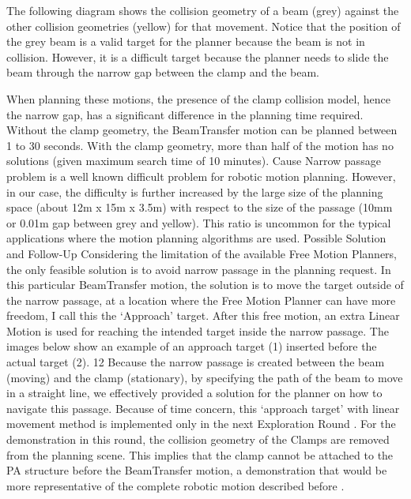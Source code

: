 The following diagram shows the collision geometry of a beam (grey) against the other collision geometries (yellow) for that movement. Notice that the position of the grey beam is a valid target for the planner because the beam is not in collision. However, it is a difficult target because the planner needs to slide the beam through the narrow gap between the clamp and the beam. 

When planning these motions, the presence of the clamp collision model, hence the narrow gap, has a significant difference in the planning time required. Without the clamp geometry, the BeamTransfer motion can be planned between 1 to 30 seconds. With the clamp geometry, more than half of the motion has no solutions (given maximum search time of 10 minutes).
Cause
Narrow passage problem is a well known difficult problem for robotic motion planning. However, in our case, the difficulty is further increased by the large size of the planning space (about 12m x 15m x 3.5m) with respect to the size of the passage (10mm or 0.01m gap between grey and yellow). This ratio is uncommon for the typical applications where the motion planning algorithms are used.
Possible Solution and Follow-Up
Considering the limitation of the available Free Motion Planners, the only feasible solution is to avoid narrow passage in the planning request. In this particular BeamTransfer motion, the solution is to move the target outside of the narrow passage, at a location where the Free Motion Planner can have more freedom, I call this the ‘Approach’ target. After this free motion, an extra Linear Motion is used for reaching the intended target inside the narrow passage. The images below show an example of an approach target (1) inserted before the actual target (2).
12
Because the narrow passage is created between the beam (moving) and the clamp (stationary), by specifying the path of the beam to move in a straight line, we effectively provided a solution for the planner on how to navigate this passage. 
Because of time concern, this ‘approach target’ with linear movement method is implemented only in the next Exploration Round . For the demonstration in this round, the collision geometry of the Clamps are removed from the planning scene. This implies that the clamp cannot be attached to the PA structure before the BeamTransfer motion, a demonstration that would be more representative of the complete robotic motion described before .

